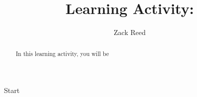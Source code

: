 \documentclass{ximera}
\author{Zack Reed}
\title{Learning Activity: }
\begin{document}
\begin{abstract}

    In this learning activity, you will be 
\end{abstract}
\maketitle


Start
\end{document}
